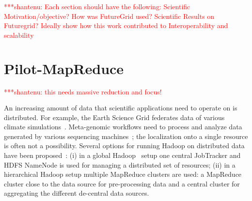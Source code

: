 \documentclass[]{paper}
\newcommand{\jhanote}[1]{ {\textcolor{red} { ***shantenu: #1 }}}
\newcommand{\jhanote}[1]{}
\begin{document}
\jhanote{Each section should have the following: Scientific Motivation/objective? How was FutureGrid used? Scientific Results on Futuregrid? Ideally show how this work contributed to Interoperability and scalability}

\section{Pilot-MapReduce}

\jhanote{this needs massive reduction and focus!}




An increasing amount of data that scientific applications need to operate on is distributed. For example, the Earth Science Grid federates data of various climate simulations~\cite{ESG}. Meta-genomic workflows need to process and analyze data generated by various sequencing machines~\cite{Jha:2011fk}; the localization onto a single resource is often not a possibility.
Several options for running Hadoop on distributed data have been proposed~\cite{weissman-mr-11}: (i) in a global Hadoop~\cite{hadoop} setup one central JobTracker and HDFS NameNode is used for managing a distributed set of resources; (ii) in a hierarchical Hadoop setup multiple MapReduce clusters are used: a MapReduce cluster close to the data source for pre-processing data and a central cluster for aggregating the different de-central data sources.
\end{document}
